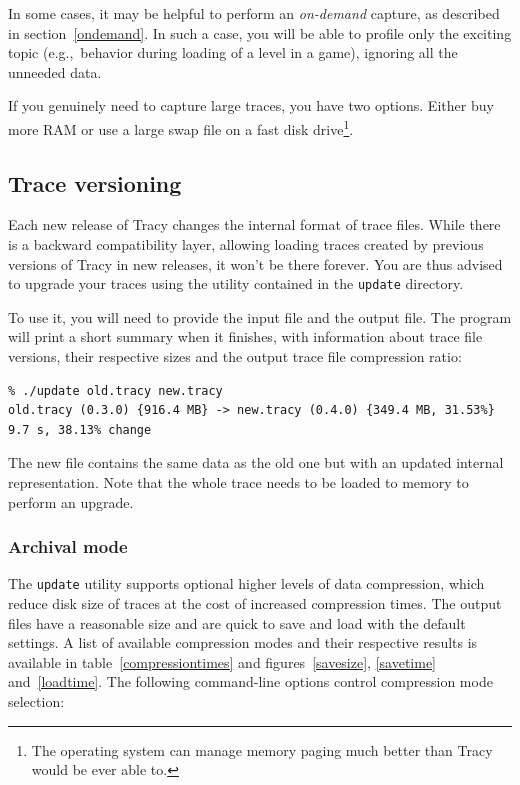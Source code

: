 \documentclass[hidelinks,titlepage,a4paper]{article}
\begin{document}
In some cases, it may be helpful to perform an \emph{on-demand} capture, as described in section~\ref{ondemand}. In such a case, you will be able to profile only the exciting topic (e.g.,\ behavior during loading of a level in a game), ignoring all the unneeded data.

If you genuinely need to capture large traces, you have two options. Either buy more RAM or use a large swap file on a fast disk drive\footnote{The operating system can manage memory paging much better than Tracy would be ever able to.}.

\subsection{Trace versioning}

Each new release of Tracy changes the internal format of trace files. While there is a backward compatibility layer, allowing loading traces created by previous versions of Tracy in new releases, it won't be there forever. You are thus advised to upgrade your traces using the utility contained in the \texttt{update} directory.

To use it, you will need to provide the input file and the output file. The program will print a short summary when it finishes, with information about trace file versions, their respective sizes and the output trace file compression ratio:

\begin{verbatim}
% ./update old.tracy new.tracy
old.tracy (0.3.0) {916.4 MB} -> new.tracy (0.4.0) {349.4 MB, 31.53%}  9.7 s, 38.13% change
\end{verbatim}

The new file contains the same data as the old one but with an updated internal representation. Note that the whole trace needs to be loaded to memory to perform an upgrade.

\subsubsection{Archival mode}
\label{archival}

The \texttt{update} utility supports optional higher levels of data compression, which reduce disk size of traces at the cost of increased compression times. The output files have a reasonable size and are quick to save and load with the default settings. A list of available compression modes and their respective results is available in table~\ref{compressiontimes} and figures~\ref{savesize}, \ref{savetime} and~\ref{loadtime}. The following command-line options control compression mode selection:
\end{document}

